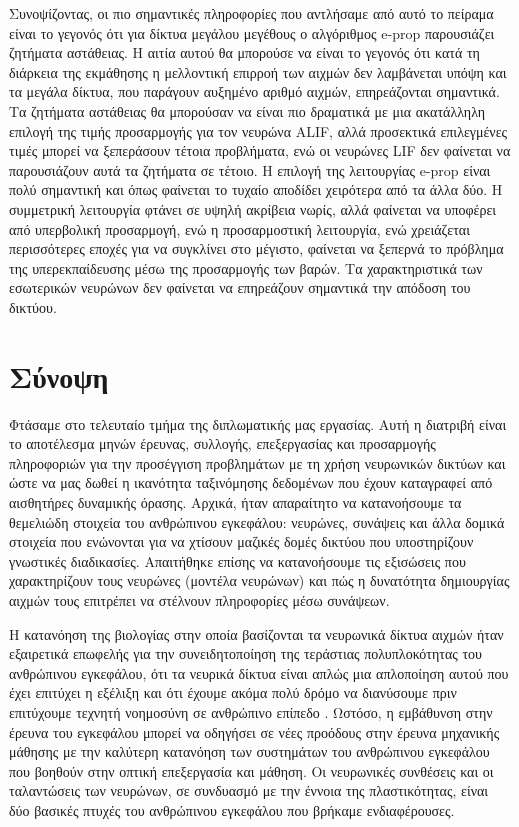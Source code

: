 \documentclass[12pt]{report}
\begin{document}
Συνοψίζοντας, οι πιο σημαντικές πληροφορίες που αντλήσαμε από αυτό το πείραμα είναι το γεγονός ότι για δίκτυα μεγάλου μεγέθους ο αλγόριθμος \textlatin{e-prop} παρουσιάζει ζητήματα αστάθειας. Η αιτία αυτού θα μπορούσε να είναι το γεγονός ότι κατά τη διάρκεια της εκμάθησης η μελλοντική επιρροή των αιχμών δεν λαμβάνεται υπόψη και τα μεγάλα δίκτυα, που παράγουν αυξημένο αριθμό αιχμών, επηρεάζονται σημαντικά. Τα ζητήματα αστάθειας θα μπορούσαν να είναι πιο δραματικά με μια ακατάλληλη επιλογή της τιμής προσαρμογής για τον νευρώνα \textlatin{ALIF}, αλλά προσεκτικά επιλεγμένες τιμές μπορεί να ξεπεράσουν τέτοια προβλήματα, ενώ οι νευρώνες \textlatin{LIF} δεν φαίνεται να παρουσιάζουν αυτά τα ζητήματα σε τέτοιο. Η επιλογή της λειτουργίας \textlatin{e-prop} είναι πολύ σημαντική και όπως φαίνεται το τυχαίο αποδίδει χειρότερα από τα άλλα δύο. Η συμμετρική λειτουργία φτάνει σε υψηλή ακρίβεια νωρίς, αλλά φαίνεται να υποφέρει από υπερβολική προσαρμογή, ενώ η προσαρμοστική λειτουργία, ενώ χρειάζεται περισσότερες εποχές για να συγκλίνει στο μέγιστο, φαίνεται να ξεπερνά το πρόβλημα της υπερεκπαίδευσης μέσω της προσαρμογής των βαρών. Τα χαρακτηριστικά των εσωτερικών νευρώνων δεν φαίνεται να επηρεάζουν σημαντικά την απόδοση του δικτύου.

\chapter{Σύνοψη}
Φτάσαμε στο τελευταίο τμήμα της διπλωματικής μας εργασίας. Αυτή η διατριβή είναι το αποτέλεσμα μηνών έρευνας, συλλογής, επεξεργασίας και προσαρμογής πληροφοριών για την προσέγγιση προβλημάτων με τη χρήση νευρωνικών δικτύων και ώστε να μας δωθεί η ικανότητα ταξινόμησης δεδομένων που έχουν καταγραφεί από αισθητήρες δυναμικής όρασης. Αρχικά, ήταν απαραίτητο να κατανοήσουμε τα θεμελιώδη στοιχεία του ανθρώπινου εγκεφάλου: νευρώνες, συνάψεις και άλλα δομικά στοιχεία που ενώνονται για να χτίσουν μαζικές δομές δικτύου που υποστηρίζουν γνωστικές διαδικασίες. Απαιτήθηκε επίσης να κατανοήσουμε τις εξισώσεις που χαρακτηρίζουν τους νευρώνες (μοντέλα νευρώνων) και πώς η δυνατότητα δημιουργίας αιχμών τους επιτρέπει να στέλνουν πληροφορίες μέσω συνάψεων.

Η κατανόηση της βιολογίας στην οποία βασίζονται τα νευρωνικά δίκτυα αιχμών ήταν εξαιρετικά επωφελής για την συνειδητοποίηση της τεράστιας πολυπλοκότητας του ανθρώπινου εγκεφάλου, ότι τα νευρικά δίκτυα είναι απλώς μια απλοποίηση αυτού που έχει επιτύχει η εξέλιξη και ότι έχουμε ακόμα πολύ δρόμο να διανύσουμε πριν επιτύχουμε τεχνητή νοημοσύνη σε ανθρώπινο επίπεδο . Ωστόσο, η εμβάθυνση στην έρευνα του εγκεφάλου μπορεί να οδηγήσει σε νέες προόδους στην έρευνα μηχανικής μάθησης με την καλύτερη κατανόηση των συστημάτων του ανθρώπινου εγκεφάλου που βοηθούν στην οπτική επεξεργασία και μάθηση. Οι νευρωνικές συνθέσεις και οι ταλαντώσεις των νευρώνων, σε συνδυασμό με την έννοια της πλαστικότητας, είναι δύο βασικές πτυχές του ανθρώπινου εγκεφάλου που βρήκαμε ενδιαφέρουσες.
\end{document}
